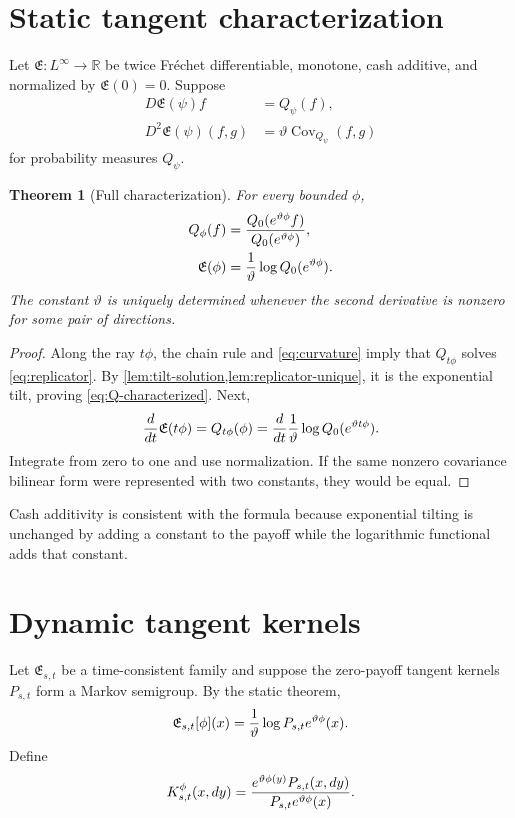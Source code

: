 \documentclass[11pt,reqno]{amsart}
\newtheorem{theorem}{Theorem}[section]
\theoremstyle{definition}
\newcommand{\R}{\mathbb R}
\begin{document}
\section{Static tangent characterization}

Let $\mathfrak E:L^\infty\to\R$ be twice Fr\'echet differentiable, monotone,
cash additive, and normalized by $\mathfrak E(0)=0$.  Suppose
\begin{align}
 D\mathfrak E(\psi)f&=Q_\psi(f),\label{eq:first-tangent}\\
 D^2\mathfrak E(\psi)(f,g)
 &=\vartheta\operatorname{Cov}_{Q_\psi}(f,g)
 \label{eq:curvature}
\end{align}
for probability measures $Q_\psi$.

\begin{theorem}[Full characterization]\label{thm:full-characterization}
For every bounded $\phi$,
\begin{align}
 Q_\phi(f)&={Q_0(e^{\vartheta\phi}f)
  \over Q_0(e^{\vartheta\phi})},\label{eq:Q-characterized}\\
 \mathfrak E(\phi)&={1\over\vartheta}
 \log Q_0(e^{\vartheta\phi}).\label{eq:E-characterized}
\end{align}
The constant $\vartheta$ is uniquely determined whenever the second derivative
is nonzero for some pair of directions.
\end{theorem}

\begin{proof}
Along the ray $t\phi$, the chain rule and \eqref{eq:curvature} imply that
$Q_{t\phi}$ solves \eqref{eq:replicator}.  By
\cref{lem:tilt-solution,lem:replicator-unique}, it is the exponential tilt,
proving \eqref{eq:Q-characterized}.  Next,
\[
 {d\over dt}\mathfrak E(t\phi)=Q_{t\phi}(\phi)
 ={d\over dt}{1\over\vartheta}
 \log Q_0(e^{\vartheta t\phi}).
\]
Integrate from zero to one and use normalization.  If the same nonzero
covariance bilinear form were represented with two constants, they would be
equal.
\end{proof}

Cash additivity is consistent with the formula because exponential tilting is
unchanged by adding a constant to the payoff while the logarithmic functional
adds that constant.

\section{Dynamic tangent kernels}

Let $\mathfrak E_{s,t}$ be a time-consistent family and suppose the zero-payoff
tangent kernels $P_{s,t}$ form a Markov semigroup.  By the static theorem,
\[
 \mathfrak E_{s,t}[\phi](x)
 ={1\over\vartheta}\log P_{s,t}e^{\vartheta\phi}(x).
\]
Define
\[
 K_{s,t}^{\phi}(x,dy)=
 {e^{\vartheta\phi(y)}P_{s,t}(x,dy)
  \over P_{s,t}e^{\vartheta\phi}(x)}.
\]
\end{document}
